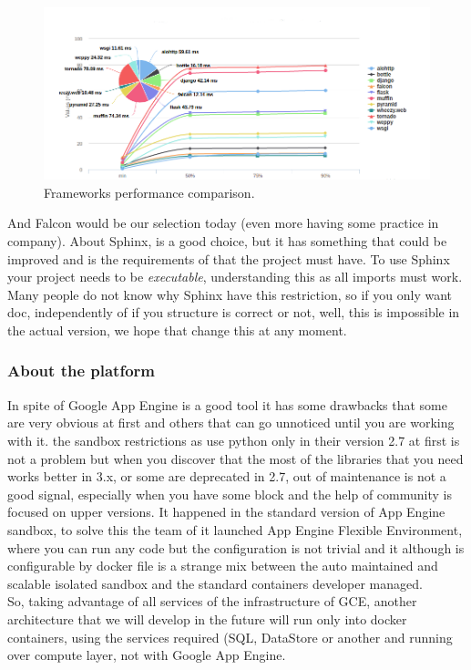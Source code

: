 \begin{figure}[H]
  \includegraphics[scale=0.5]{img/graphics/frameworks.png}
  \centering
  \caption{Frameworks performance comparison.}
\end{figure}


\noindent And Falcon would be our selection today (even more having some practice in
company).
\intro
About Sphinx, is a good choice, but it has something that could be improved and
is the requirements of that the project must have. To use Sphinx your project
needs to be \textit{executable}, understanding this as all imports must work.
Many people do not know why Sphinx have this restriction, so if you
only want doc, independently of if you structure is correct or not, well, this is
impossible in the actual version, we hope that change this at any moment.

\subsubsection{About the platform}

In spite of Google App Engine is a good tool it has some drawbacks that some are
very obvious at first and others that can go unnoticed until you are working with it.
the sandbox restrictions as use python only in their version 2.7 at first is not
a problem but when you discover that the most of the libraries that you need works
better in 3.x, or some are deprecated in 2.7, out of maintenance is not a good
signal, especially when you have some block and the help of community is focused
on upper versions. It happened in the standard version of App Engine sandbox, to
solve this the team of it launched App Engine Flexible Environment, where you can
run any code but the configuration is not trivial and it although is configurable by
docker file is a strange mix between the auto maintained and scalable isolated
sandbox and the standard containers developer managed.
\intro
\\
So, taking advantage of all services of the infrastructure of GCE, another
architecture that we will develop in the future will run only into docker containers,
using the services required (SQL, DataStore or another and running over compute layer,
not with Google App Engine.

